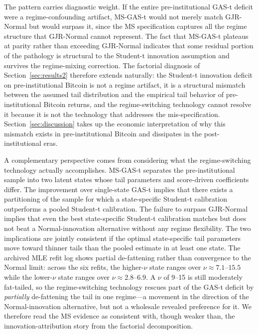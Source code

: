 The pattern carries diagnostic weight. If the entire pre-institutional GAS-t deficit were a regime-confounding artifact, MS-GAS-t would not merely match GJR-Normal but would surpass it, since the MS specification captures all the regime structure that GJR-Normal cannot represent. The fact that MS-GAS-t plateaus at parity rather than exceeding GJR-Normal indicates that some residual portion of the pathology is structural to the Student-t innovation assumption and survives the regime-mixing correction. The factorial diagnosis of Section~\ref{sec:results2} therefore extends naturally: the Student-t innovation deficit on pre-institutional Bitcoin is not a regime artifact, it is a structural mismatch between the assumed tail distribution and the empirical tail behavior of pre-institutional Bitcoin returns, and the regime-switching technology cannot resolve it because it is not the technology that addresses the mis-specification. Section~\ref{sec:discussion} takes up the economic interpretation of why this mismatch exists in pre-institutional Bitcoin and dissipates in the post-institutional eras.

A complementary perspective comes from considering what the regime-switching technology actually accomplishes. MS-GAS-t separates the pre-institutional sample into two latent states whose tail parameters and score-driven coefficients differ. The improvement over single-state GAS-t implies that there exists a partitioning of the sample for which a state-specific Student-t calibration outperforms a pooled Student-t calibration. The failure to surpass GJR-Normal implies that even the best state-specific Student-t calibration matches but does not beat a Normal-innovation alternative without any regime flexibility. The two implications are jointly consistent if the optimal state-specific tail parameters move toward thinner tails than the pooled estimate in at least one state. The archived MLE refit log shows partial de-fattening rather than convergence to the Normal limit: across the six refits, the higher-$\nu$ state ranges over $\nu \approx 7.1$--$15.5$ while the lower-$\nu$ state ranges over $\nu \approx 2.8$--$6.9$. A $\nu$ of 9--15 is still moderately fat-tailed, so the regime-switching technology rescues part of the GAS-t deficit by \emph{partially} de-fattening the tail in one regime---a movement in the direction of the Normal-innovation alternative, but not a wholesale revealed preference for it. We therefore read the MS evidence as consistent with, though weaker than, the innovation-attribution story from the factorial decomposition.

